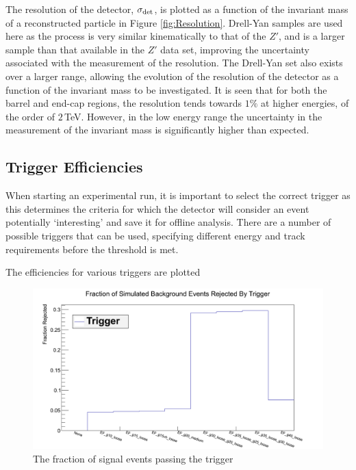\documentclass{article}
\begin{document}
The resolution of the detector, $\sigma_{\rm{det}}$, is plotted as a function of the invariant mass of a reconstructed particle in Figure \ref{fig:Resolution}. Drell-Yan samples are used here as the process is very similar kinematically to that of the $Z'$, and is a larger sample than that available in the $Z'$ data set, improving the uncertainty associated with the measurement of the resolution. The Drell-Yan set also exists over a larger range, allowing the evolution of the resolution of the detector as a function of the invariant mass to be investigated. It is seen that for both the barrel and end-cap regions, the resolution tends towards $1\%$ at higher energies, of the order of $2\,$TeV. However, in the low energy range the uncertainty in the measurement of the invariant mass is significantly higher than expected.

\subsection{Trigger Efficiencies}
\label{sec:MCA_Trigger}

When starting an experimental run, it is important to select the correct trigger as this determines the criteria for which the detector will consider an event potentially `interesting' and save it for offline analysis. There are a number of possible triggers that can be used, specifying different energy and track requirements before the threshold is met.

The efficiencies for various triggers are plotted 

\begin{figure}[h]
    \centering \includegraphics[scale=0.3]{images/TriggerEfficiencies.png} \caption{ The fraction of signal events passing the trigger \label{fig:TriggerZ} }
\end{figure}
\end{document}
